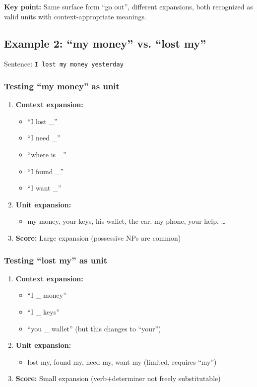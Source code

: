 \documentclass[11pt]{article}
\begin{document}
\textbf{Key point:} Same surface form ``go out'', different expansions, both recognized as valid units with context-appropriate meanings.

\subsection{Example 2: ``my money'' vs. ``lost my''}

Sentence: \texttt{I lost my money yesterday}

\subsubsection{Testing ``my money'' as unit}

\begin{enumerate}
\item \textbf{Context expansion:}
\begin{itemize}
\item ``I lost \_''
\item ``I need \_''
\item ``where is \_''
\item ``I found \_''
\item ``I want \_''
\end{itemize}
\item \textbf{Unit expansion:}
\begin{itemize}
\item my money, your keys, his wallet, the car, my phone, your help, \ldots
\end{itemize}
\item \textbf{Score:} Large expansion (possessive NPs are common)
\end{enumerate}

\subsubsection{Testing ``lost my'' as unit}

\begin{enumerate}
\item \textbf{Context expansion:}
\begin{itemize}
\item ``I \_ money''
\item ``I \_ keys''
\item ``you \_ wallet'' (but this changes to ``your'')
\end{itemize}
\item \textbf{Unit expansion:}
\begin{itemize}
\item lost my, found my, need my, want my (limited, requires ``my'')
\end{itemize}
\item \textbf{Score:} Small expansion (verb+determiner not freely substitutable)
\end{enumerate}
\end{document}
